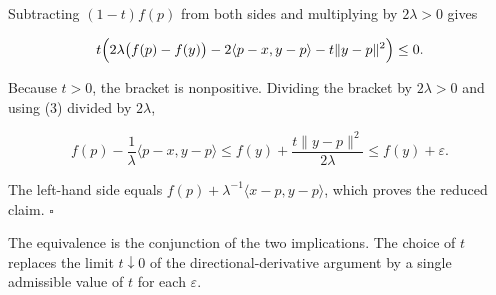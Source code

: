\documentclass[11pt,a4paper]{report}
\begin{document}
Subtracting \((1-t)f(p)\) from both sides and multiplying by \(2\lambda>0\) gives


\[t\Bigl(2\lambda\bigl(f(p)-f(y)\bigr)-2\langle p-x,y-p\rangle-t\|y-p\|^2\Bigr)\le0.\]


Because \(t>0\), the bracket is nonpositive. Dividing the bracket by \(2\lambda>0\) and using (3) divided by \(2\lambda\),


\[f(p)-\frac1\lambda\langle p-x,y-p\rangle\le f(y)+\frac{t\|y-p\|^2}{2\lambda}\le f(y)+\varepsilon.\]


The left-hand side equals \(f(p)+\lambda^{-1}\langle x-p,y-p\rangle\), which proves the reduced claim. \(\square\)




The equivalence is the conjunction of the two implications. The choice of \(t\) replaces the limit \(t\downarrow0\) of the directional-derivative argument by a single admissible value of \(t\) for each \(\varepsilon\).
\end{document}
